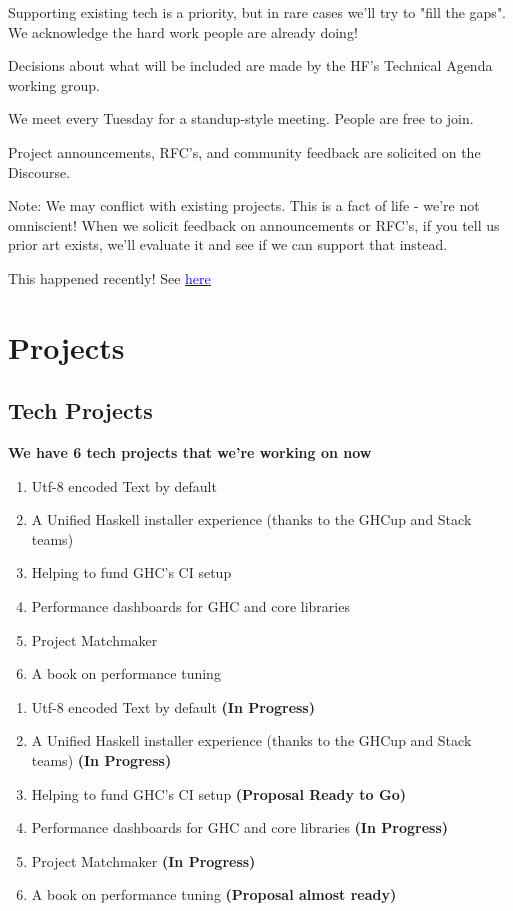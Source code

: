 \documentclass[tikz]{beamer}
\newcommand{\blue}[1]{\textcolor{blue}{#1}}
\theoremstyle{definition}
\begin{document}
\frame 
{
		
	Supporting existing tech is a priority, but in rare cases we'll try to "fill the gaps". We acknowledge the hard work people are already doing! 

}

\frame
{
 	Decisions about what will be included are made by the HF's Technical Agenda working group. 
}

\frame
{ 
	We meet every Tuesday for a standup-style meeting. People are free to join. 
}

\frame
{
	Project announcements, RFC's, and community feedback are solicited on the Discourse. 
}

\frame
{ 
	Note: We may conflict with existing projects. This is a fact of life - we're not omniscient! When we solicit feedback on announcements or RFC's, if you tell us prior art exists, we'll evaluate it and see if we can support that instead. 
}

\frame
{ 
	This happened recently! See \href{https://discourse.haskell.org/t/proposal-unified-installer/2468/6?u=emilypi}{\blue{here}}
	
}

\section{Projects}
\subsection{Tech Projects}
\frame
{
	\textbf{We have 6 tech projects that we're working on now}
}

\frame
{ 
	\begin{enumerate}
		\item Utf-8 encoded Text by default 
		\item A Unified Haskell installer experience (thanks to the GHCup and Stack teams)
		\item Helping to fund GHC's CI setup
		\item Performance dashboards for GHC and core libraries
		\item Project Matchmaker 
		\item A book on performance tuning
	\end{enumerate}
}

\frame
{ 
	\begin{enumerate}
		\item Utf-8 encoded Text by default \textbf{(In Progress)}
		\item A Unified Haskell installer experience (thanks to the GHCup and Stack teams) \textbf{(In Progress)}
		\item Helping to fund GHC's CI setup \textbf{(Proposal Ready to Go)}
		\item Performance dashboards for GHC and core libraries \textbf{(In Progress)}
		\item Project Matchmaker \textbf{(In Progress)}
		\item A book on performance tuning \textbf{(Proposal almost ready)}
	\end{enumerate}
}
\end{document}
